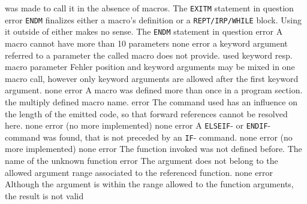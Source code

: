 \documentclass[12pt,twoside]{report}
\newcommand{\tty}[1]{{\tt #1}}
\begin{document}
\begin{description}
{                was made to call it in the absence of macros.}
               {The \tty{EXITM} statement in question}
               {error}
               {\tty{ENDM} finalizes either a macro's definition or a
                \tty{REPT/IRP/WHILE} block.  Using it outside of either
                makes no sense.}
               {The \tty{ENDM} statement in question}
               {error}
               {A macro cannot have more than 10 parameters}
               {none}
               {error}
               {a keyword argument referred to a parameter the
                called macro does not provide.}
               {used keyword resp. macro parameter}
               {Fehler}
               {position and keyword arguments  may be mixed in
                one macro call, however only keyword arguments
                are allowed after the first keyword argument.}
               {none}
               {error}
               {A macro was defined more than once in a program section.}
               {the multiply defined macro name.}
               {error}
               {The command used has an influence on the length of the
                emitted code, so that forward references cannot be resolved
                here.}
               {none}
               {error}
               {(no more implemented)}
               {none}
               {error}
               {A \tty{ELSEIF}- or \tty{ENDIF}- command was found, that is not preceded
                by an \tty{IF}- command.}
               {none}
               {error}
               {(no more implemented)}
               {none}
               {error}
               {The function invoked was not defined before.}
               {The name of the unknown function}
               {error}
               {The argument does not belong to the allowed argument range
                associated to the referenced function.}
               {none}
               {error}
               {Although the argument is within the range allowed to the
                function arguments, the result is not valid}

\end{description}
\end{document}
